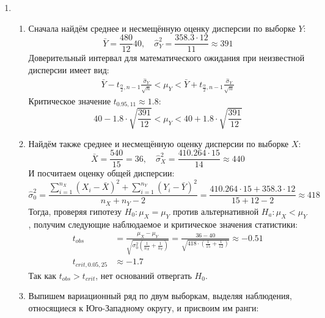 \begin{enumerate}
\begin{enumerate}
\end{enumerate}
\item
\begin{enumerate}
\item Сначала найдём среднее и несмещённую оценку дисперсии по выборке $Y$:
\[
\bar Y = \frac{480}{12} 40, \quad \hat{\sigma}^2_Y = \frac{358.3 \cdot 12}{11} \approx 391
\]
Доверительный интервал для математического ожидания при неизвестной дисперсии имеет вид:
\begin{align*}
\bar Y - t_{\frac{\alpha}{2}, n-1} \frac{\hat{\sigma}_Y}{\sqrt{n}} < \mu_Y < \bar Y + t_{\frac{\alpha}{2}, n-1} \frac{\hat{\sigma}_Y}{\sqrt{n}}
\end{align*}
Критическое значение $t_{0.95, 11} \approx 1.8$:
\[
40 - 1.8 \cdot \sqrt{\frac{391}{12}} < \mu_Y < 40 + 1.8 \cdot \sqrt{\frac{391}{12}}
\]
\item Найдём также среднее и несмещённую оценку дисперсии по выборке $X$:
\[
\bar X = \frac{540}{15} = 36, \quad \hat{\sigma}^2_X = \frac{410.264 \cdot 15}{14} \approx 440
\]
И посчитаем оценку общей дисперсии:
\[
\hat{\sigma}^2_0 = \frac{\sum_{i=1}^{n_X} \left(X_i - \bar X\right)^2 + \sum_{i=1}^{n_Y} \left(Y_i - \bar Y\right)^2}{n_X + n_Y - 2} =  \frac{410.264 \cdot 15 + 358.3 \cdot 12}{15 + 12 - 2} \approx 418
\]
Тогда, проверяя гипотезу $H_0: \mu_X = \mu_Y$ против альтернативной $H_a: \mu_X < \mu_Y$,
получим следующие наблюдаемое и критическое значения статистики:
\begin{align*}
t_{obs} &= \frac{\mu_X - \mu_Y}{\sqrt{\sigma^2_0 \left(\frac{1}{n_X} + \frac{1}{n_Y}\right)}} = \frac{36 - 40}{\sqrt{418 \cdot \left(\frac{1}{15} + \frac{1}{12}\right)}} \approx -0.51 \\
t_{crit, 0.05, 25} &\approx -1.7
\end{align*}
Так как $t_{obs} > t_{crit}$, нет оснований отвергать $H_0$.
\item Выпишем вариационный ряд по двум выборкам, выделяя наблюдения, относящиеся к
Юго-Западному округу, и присвоим им ранги:


\end{enumerate}
\end{enumerate}
